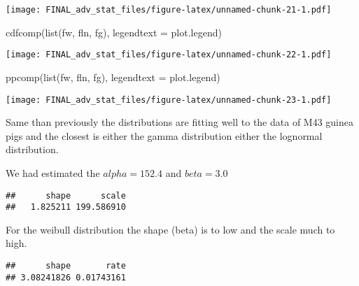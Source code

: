 \documentclass[
]{article}
\newenvironment{Shaded}{\begin{snugshade}}{\end{snugshade}}
\newcommand{\AttributeTok}[1]{\textcolor[rgb]{0.77,0.63,0.00}{#1}}
\newcommand{\FunctionTok}[1]{\textcolor[rgb]{0.00,0.00,0.00}{#1}}
\newcommand{\NormalTok}[1]{#1}
\newcommand{\SpecialCharTok}[1]{\textcolor[rgb]{0.00,0.00,0.00}{#1}}
\begin{document}
\texttt{[image: FINAL\_adv\_stat\_files/figure-latex/unnamed-chunk-21-1.pdf]}

\begin{Shaded}
\begin{Highlighting}[]
\FunctionTok{cdfcomp}\NormalTok{(}\FunctionTok{list}\NormalTok{(fw, fln, fg), }\AttributeTok{legendtext =}\NormalTok{ plot.legend) }
\end{Highlighting}
\end{Shaded}

\texttt{[image: FINAL\_adv\_stat\_files/figure-latex/unnamed-chunk-22-1.pdf]}

\begin{Shaded}
\begin{Highlighting}[]
\FunctionTok{ppcomp}\NormalTok{(}\FunctionTok{list}\NormalTok{(fw, fln, fg), }\AttributeTok{legendtext =}\NormalTok{ plot.legend)}
\end{Highlighting}
\end{Shaded}

\texttt{[image: FINAL\_adv\_stat\_files/figure-latex/unnamed-chunk-23-1.pdf]}

Same than previously the distributions are fitting well to the data of
M43 guinea pigs and the closest is either the gamma distribution either
the lognormal distribution.

We had estimated the \(alpha = 152.4\) and \(beta = 3.0\)

\begin{Shaded}
\end{Shaded}

\begin{verbatim}
##      shape      scale 
##   1.825211 199.586910
\end{verbatim}

For the weibull distribution the shape (beta) is to low and the scale
much to high.

\begin{Shaded}
\end{Shaded}

\begin{verbatim}
##      shape       rate 
## 3.08241826 0.01743161
\end{verbatim}
\end{document}
